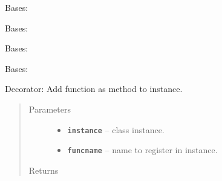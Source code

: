 \documentclass[letterpaper,10pt,english]{sphinxmanual}
\begin{document}

\begin{fulllineitems}
\label{RRtoolbox.lib:RRtoolbox.lib.root.TimeOutException}
Bases: 

\end{fulllineitems}


\begin{fulllineitems}
\label{RRtoolbox.lib:RRtoolbox.lib.root.TransferExeption}
Bases: 

\end{fulllineitems}


\begin{fulllineitems}
\label{RRtoolbox.lib:RRtoolbox.lib.root.VariableNotDeletable}
Bases: 

\end{fulllineitems}


\begin{fulllineitems}
\label{RRtoolbox.lib:RRtoolbox.lib.root.VariableNotSettable}
Bases: 

\end{fulllineitems}


\begin{fulllineitems}
\label{RRtoolbox.lib:RRtoolbox.lib.root.addto}
Decorator: Add function as method to instance.
\begin{quote}\begin{description}
\item[{Parameters}] \leavevmode\begin{itemize}
\item {} 
\textbf{\texttt{instance}} -- class instance.

\item {} 
\textbf{\texttt{funcname}} -- name to register in instance.

\end{itemize}

\item[{Returns}] \leavevmode


\end{description}\end{quote}

\end{fulllineitems}
\end{document}
